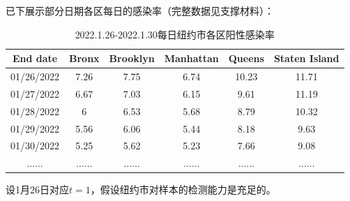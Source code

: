 \documentclass[withoutpreface,bwprint]{cumcmthesis} %
\begin{document}
已下展示部分日期各区每日的感染率（完整数据见支撑材料）：
\begin{table}[H]
\centering
\begin{tabular}{cccccc}
\toprule
End date   & Bronx & Brooklyn & Manhattan & Queens & Staten Island \\ 
\midrule
01/26/2022 & 7.26  & 7.75     & 6.74      & 10.23  & 11.71         \\
01/27/2022 & 6.67  & 7.03     & 6.15      & 9.61   & 11.19         \\
01/28/2022 & 6     & 6.53     & 5.68      & 8.79   & 10.32         \\
01/29/2022 & 5.56  & 6.06     & 5.44      & 8.18   & 9.63          \\
01/30/2022 & 5.25  & 5.62     & 5.23      & 7.66   & 9.08          \\
......     & ...... &...... &...... &...... &...... \\
\bottomrule
\end{tabular}
\caption{2022.1.26-2022.1.30每日纽约市各区阳性感染率}
\end{table}
设1月26日对应$t=1$，假设纽约市对样本的检测能力是充足的。
\end{document}
